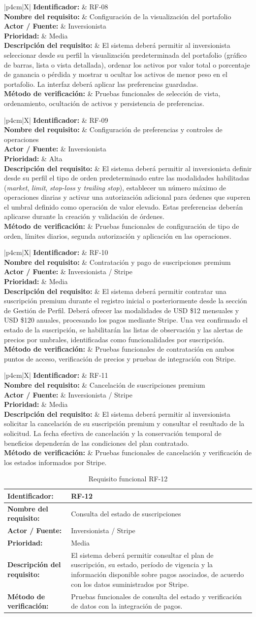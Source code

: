 \documentclass[11pt,a4paper,oneside]{article}
\newcommand{\tablaRequisito}[6]{%
\begin{table}[H]
\centering
\begin{tabularx}{\linewidth}{|p{4cm}|X|}
\hline
\textbf{Identificador:} & #1 \\ \hline
\textbf{Nombre del requisito:} & #2 \\ \hline
\textbf{Actor / Fuente:} & #3 \\ \hline
\textbf{Prioridad:} & #4 \\ \hline
\textbf{Descripción del requisito:} &
#5 \\ \hline
\textbf{Método de verificación:} & #6 \\ \hline
\end{tabularx}
\caption{Requisito funcional #1}
\label{tab:#1}
\end{table}
}
\begin{document}
\tablaRequisito
{RF-08}
{Configuración de la visualización del portafolio}
{Inversionista}
{Media}
{El sistema deberá permitir al inversionista seleccionar desde su perfil la visualización predeterminada del portafolio (gráfico de barras, lista o vista detallada), ordenar los activos por valor total o porcentaje de ganancia o pérdida y mostrar u ocultar los activos de menor peso en el portafolio. La interfaz deberá aplicar las preferencias guardadas.}
{Pruebas funcionales de selección de vista, ordenamiento, ocultación de activos y persistencia de preferencias.}


\tablaRequisito
{RF-09}
{Configuración de preferencias y controles de operaciones}
{Inversionista}
{Alta}
{El sistema deberá permitir al inversionista definir desde su perfil el tipo de orden predeterminado entre las modalidades habilitadas (\textit{market}, \textit{limit}, \textit{stop-loss} y \textit{trailing stop}), establecer un número máximo de operaciones diarias y activar una autorización adicional para órdenes que superen el umbral definido como operación de valor elevado. Estas preferencias deberán aplicarse durante la creación y validación de órdenes.}
{Pruebas funcionales de configuración de tipo de orden, límites diarios, segunda autorización y aplicación en las operaciones.}


\tablaRequisito
{RF-10}
{Contratación y pago de suscripciones premium}
{Inversionista / Stripe}
{Media}
{El sistema deberá permitir contratar una suscripción premium durante el registro inicial o posteriormente desde la sección de Gestión de Perfil. Deberá ofrecer las modalidades de USD \$12 mensuales y USD \$120 anuales, procesando los pagos mediante Stripe. Una vez confirmado el estado de la suscripción, se habilitarán las listas de observación y las alertas de precios por umbrales, identificadas como funcionalidades por suscripción.}
{Pruebas funcionales de contratación en ambos puntos de acceso, verificación de precios y pruebas de integración con Stripe.}


\tablaRequisito
{RF-11}
{Cancelación de suscripciones premium}
{Inversionista / Stripe}
{Media}
{El sistema deberá permitir al inversionista solicitar la cancelación de su suscripción premium y consultar el resultado de la solicitud. La fecha efectiva de cancelación y la conservación temporal de beneficios dependerán de las condiciones del plan contratado.}
{Pruebas funcionales de cancelación y verificación de los estados informados por Stripe.}


\tablaRequisito
{RF-12}
{Consulta del estado de suscripciones}
{Inversionista / Stripe}
{Media}
{El sistema deberá permitir consultar el plan de suscripción, su estado, período de vigencia y la información disponible sobre pagos asociados, de acuerdo con los datos suministrados por Stripe.}
{Pruebas funcionales de consulta del estado y verificación de datos con la integración de pagos.}
\end{document}
